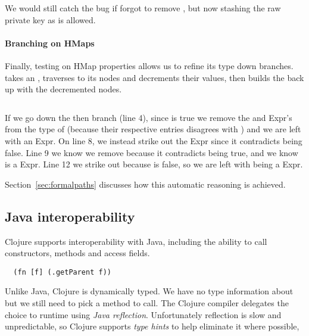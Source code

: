 \begin{exmp}
\inputminted[firstline=10,lastline=21]{clojure}{code/demo/src/demo/key2.clj}
\end{exmp}

We would still catch the bug if  forgot to remove ,
but now stashing the raw private key as  is allowed.

\paragraph{Branching on HMaps} Finally, testing on HMap properties
allows us to refine its type down branches.  takes an
, traverses to its nodes and decrements their values, then
builds the  back up with the decremented nodes.

\begin{exmp}
\inputminted[linenos,firstnumber=1,firstline=15,lastline=27]{clojure}{code/demo/src/demo/hmap.clj}
\label{example:decmap}
\end{exmp}

If we go down the then branch (line 4), since  is true
we remove
the  and 
Expr's from the type of  (because their respective  entries disagrees with )
and we are left with an  Expr.
On line 8,
we instead strike out the  Expr since it contradicts  being false. 
Line 9 we know 
we remove  because it contradicts  being true,
and we know  is a  Expr.
Line 12 we strike out  because  is false,
so we are left with  being a  Expr.

Section~\ref{sec:formalpaths} discusses how this automatic reasoning is achieved.

\subsection{Java interoperability}
\label{sec:overviewjavainterop}

Clojure supports interoperability with Java, including the ability to
call constructors, methods and access fields.

\begin{verbatim}
  (fn [f] (.getParent f))
\end{verbatim}

Unlike Java, Clojure is dynamically typed. We have no type information about 
but we still need to pick a method to call. The Clojure compiler delegates
the choice to runtime using \emph{Java reflection}.
Unfortunately reflection is slow and unpredictable, so Clojure supports \emph{type hints}
to help eliminate it where possible, 

